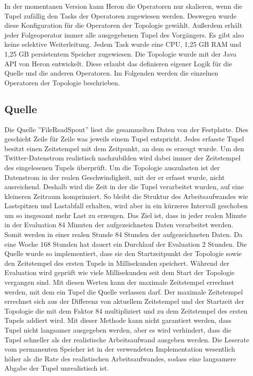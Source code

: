 In der momentanen Version kann Heron die Operatoren nur skalieren, wenn die Tupel zufällig den Tasks der Operatoren zugewiesen werden.
Deswegen wurde diese Konfiguration für die Operatoren der Topologie gewählt.
Außerdem erhält jeder Folgeoperator immer alle ausgegebenen Tupel des Vorgängers.
Es gibt also keine selektive Weiterleitung.
Jedem Task wurde eine CPU, 1,25 GB RAM und 1,25 GB persistentem Speicher zugewiesen.
Die Topologie wurde mit der Java API von Heron entwickelt.
Diese erlaubt das definieren eigener Logik für die Quelle und die anderen Operatoren.
Im Folgenden werden die einzelnen Operatoren der Topologie beschrieben.

\subsection{Quelle}
Die Quelle ''FileReadSpout'' liest die gesammelten Daten von der Festplatte.
Dies geschieht Zeile für Zeile was jeweils einem Tupel entspricht.
Jedes erfasste Tupel besitzt einen Zeitstempel mit dem Zeitpunkt, an dem es erzeugt wurde.
Um den Twitter-Datenstrom realistisch nachzubilden wird dabei immer der Zeitstempel des eingelesenen Tupels überprüft.
Um die Topologie auszulasten ist der Datenstrom in der realen Geschwindigkeit, mit der er erfasst wurde, nicht ausreichend.
Deshalb wird die Zeit in der die Tupel verarbeitet wurden, auf eine kleineren Zeitraum komprimiert.
So bleibt die Struktur des Arbeitsaufwandes wie Lastspitzen und Lastabfall erhalten, wird aber in ein kürzeres Intervall geschoben um so insgesamt mehr Last zu erzeugen.
Das Ziel ist, dass in jeder realen Minute in der Evaluation 84 Minuten der aufgezeichneten Daten verarbeitet werden.
Somit werden in einer realen Stunde 84 Stunden der aufgezeichneten Daten.
Da eine Woche 168 Stunden hat dauert ein Durchlauf der Evaluation 2 Stunden.
Die Quelle wurde so implementiert, dass sie den Startzeitpunkt der Topologie sowie den Zeitstempel des ersten Tupels in Millisekunden speichert.
Während der Evaluation wird geprüft wie viele Millisekunden seit dem Start der Topologie vergangen sind.
Mit diesen Werten kann der maximale Zeitstempel errechnet werden, mit dem ein Tupel die Quelle verlassen darf.
Der maximale Zeitstempel errechnet sich aus der Differenz von aktuellem Zeitstempel und der Startzeit der Topologie die mit dem Faktor 84 multipliziert und zu dem Zeitstempel des ersten Tupels addiert wird.
Mit dieser Methode kann nicht garantiert werden, dass Tupel nicht langsamer ausgegeben werden, aber es wird verhindert, dass die Tupel schneller als der realistische Arbeitsaufwand ausgeben werden.
Die Leserate vom permanenten Speicher ist in der verwendeten Implementation wesentlich höher als die Rate des realistischen Arbeitsaufwandes, sodass eine langsamere Abgabe der Tupel unrealistisch ist.

